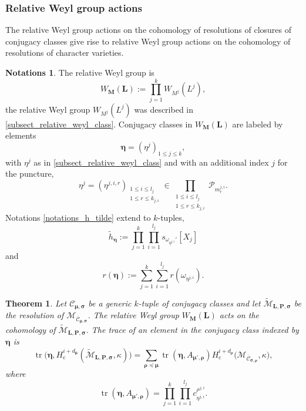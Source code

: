 \documentclass[11pt]{article}
\newcommand{\rc}{\mathrm{c}}
\theoremstyle{definition}
\newtheorem{notations}[definition]{Notations}
\theoremstyle{plain}
\newtheorem{theorem}[definition]{Theorem}
\DeclareMathOperator{\tr}{tr}
\newcommand{\Part}{\mathcal{P}}
\newcommand{\mlps}{\widetilde{\mathcal{M}}_{\boldsymbol{L},\boldsymbol{P},\boldsymbol{\sigma}}}
\begin{document}
\subsubsection{Relative Weyl group actions}\label{subsect_relative_weyl_char}

The relative Weyl group actions on the cohomology of resolutions of closures of conjugacy classes give rise to relative Weyl group actions on the cohomology of resolutions of character varieties.

\begin{notations}\label{notations_k_h_tilde}
The relative Weyl group is
\[
W_{\boldsymbol{M}}\left(\boldsymbol{L}\right):=\prod_{j=1}^k W_{M^j}(L^j),
\]
the relative Weyl group $W_{M^j}(L^j)$ was described in \ref{subsect_relative_weyl_class}.
Conjugacy classes in $W_{\boldsymbol{M}}(\boldsymbol{L})$ are labeled by elements
\[
\boldsymbol{\eta} = (\eta^j)_{1\le j\le k},
\]
with $\eta^j $
as in \ref{subsect_relative_weyl_class} and with an additional index $j$ for the puncture,
\[
\eta^j =(\eta^{j,i,r})_{\substack{ 1 \le i \le l_j\\ 1 \le r \le k_{j,i}}} \in \prod_{\substack{ 1 \le i \le l_j \\ 1 \le r \le k_{j,i}}} \Part_{m^{j,i}_{r}}.
\]
Notations \ref{notations_h_tilde} extend to $k$-tuples,
\[
\widetilde{h}_{\boldsymbol{\eta}}:=\prod_{j=1}^k\prod_{i=1}^{l_j} s_{ {\omega_{\eta^{j,i}}}' }\left[ X_j\right]
\]
and
\[
r(\boldsymbol{\eta}):=\sum_{j=1}^k\sum_{i=1}^{l_j} r(\omega_{\eta^{j,i}}).
\]
\end{notations}

\begin{theorem}\label{th_tr_resol}
Let $\mathcal{C}_{\boldsymbol{\mu},\boldsymbol{\sigma}}$ be a generic $k$-tuple of conjugacy classes and let $\mlps$ be the resolution of $\mathcal{M}_{\overline{\mathcal{C}}_{\boldsymbol{\mu},\boldsymbol{\sigma}}}$. The relative Weyl group $W_{\boldsymbol{M}}(\boldsymbol{L})$ acts on the cohomology of $\mlps$. The trace of an element in the conjugacy class indexed by $\boldsymbol{\eta}$ is
\[
\tr\bigl(\boldsymbol{\eta}, H_\rc^{i+d_{\boldsymbol{\mu}}}(\mlps,\kappa)\bigr) = \sum_{\boldsymbol{\rho\preceq \mu}} \tr\left(\boldsymbol{\eta}, A_{\boldsymbol{\mu'},\boldsymbol{\rho}}\right) H_\rc^{i+d_{\boldsymbol{\rho}}}\bigl(\mathcal{M}_{\overline{\boldsymbol{\mathcal{C}}}_{\boldsymbol{\sigma},\boldsymbol{\rho}}},\kappa\bigr),
\]
where
\[
\tr\left(\boldsymbol{\eta}, A_{\boldsymbol{\mu'},\boldsymbol{\rho}}\right) = \prod_{j=1}^k\prod_{i=1}^{l_j} c^{\rho^{j,i}}_{\eta^{j,i}}.
\]
\end{theorem}
\end{document}

